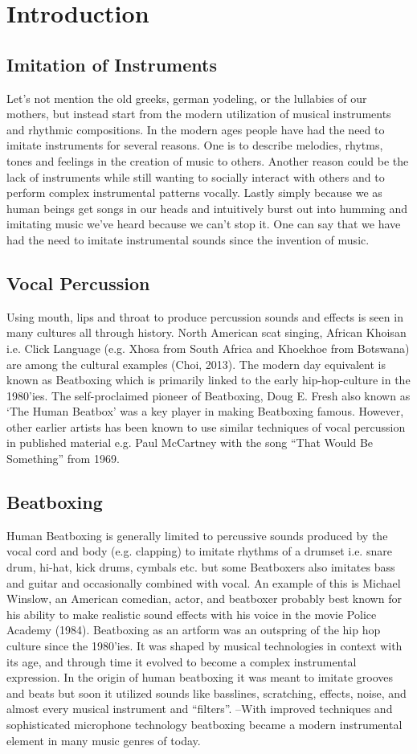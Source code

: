 \section{ Introduction }
\subsection{ Imitation of Instruments }
Let’s not mention the old greeks, german yodeling, or the lullabies of our mothers, but instead start from the modern utilization of musical instruments and rhythmic compositions. In the modern ages people have had the need to imitate instruments for several reasons. One is to describe melodies, rhytms, tones and feelings in the creation of music to others. Another reason could be the lack of instruments while still wanting to socially interact with others and to perform complex instrumental patterns vocally. Lastly simply because we as human beings get songs in our heads and intuitively burst out into humming and imitating music we’ve heard because we can’t stop it. One can say that we have had the need to imitate instrumental sounds since the invention of music.
\subsection{ Vocal Percussion }
Using mouth, lips and throat to produce percussion sounds and effects is seen in many cultures all through history. North American scat singing, African Khoisan i.e. Click Language (e.g. Xhosa from South Africa and Khoekhoe from Botswana) are among the cultural examples (Choi, 2013).	
The modern day equivalent is known as Beatboxing which is primarily linked to the early hip-hop-culture in the 1980’ies. The self-proclaimed pioneer of Beatboxing, Doug E. Fresh also known as ‘The Human Beatbox’ was a key player in making Beatboxing famous. However, other earlier artists has been known to use similar techniques of vocal percussion in published material e.g. Paul McCartney with the song “That Would Be Something” from 1969.
\subsection{ Beatboxing }
Human Beatboxing is generally limited to percussive sounds produced by the vocal cord and body (e.g. clapping) to imitate rhythms of a drumset i.e. snare drum, hi-hat, kick drums, cymbals etc. but some Beatboxers also imitates bass and guitar and occasionally combined with vocal. An example of this is Michael Winslow, an American comedian, actor, and beatboxer probably best known for his ability to make realistic sound effects with his voice in the movie Police Academy (1984). Beatboxing as an artform was an outspring of the hip hop culture since the 1980’ies. It was shaped by musical technologies in context with its age, and through time it evolved to become a complex instrumental expression. In the origin of human beatboxing it was meant to imitate grooves and beats but soon it utilized sounds like basslines, scratching, effects, noise, and almost every musical instrument and “filters”. –With improved techniques and sophisticated microphone technology beatboxing became a modern instrumental element in many music genres of today.
